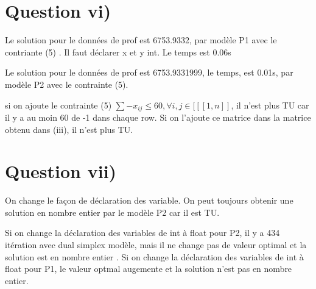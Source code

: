 \documentclass[12pt,a4paper]{article}
\begin{document}
\section{Question vi)}
Le solution pour le données de prof est 6753.9332, par modèle P1 avec le contriante (5) . Il faut déclarer x et y int. Le temps est 0.06s

Le solution pour le données de prof est 6753.9331999, le temps, est 0.01s, par modèle P2 avec le contrainte (5).

si on ajoute le contrainte (5) 
	$\sum -x_{ij}\leq 60,\forall i,j \in [[\![1,n]\!]$, il n'est plus TU car il y a au moin 60 de -1 dans chaque row. Si on l'ajoute ce matrice dans la matrice obtenu dans (iii), il n'est plus TU.

\section{Question vii)}
On change le façon de déclaration des variable. On peut toujours obtenir une solution en nombre entier par le modèle P2 car il est TU.

Si on change la déclaration des variables de int à float pour P2,  il y a 434 itération avec dual simplex modèle, mais il ne change pas de valeur optimal et la solution est en nombre entier . Si on change la déclaration des variables de int à float pour P1,  le valeur optmal augemente et la solution n'est pas en nombre entier.
\end{document}
